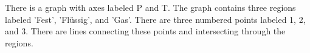 There is a graph with axes labeled P and T. The graph contains three regions labeled 'Fest', 'Flüssig', and 'Gas'. There are three numbered points labeled 1, 2, and 3. There are lines connecting these points and intersecting through the regions.